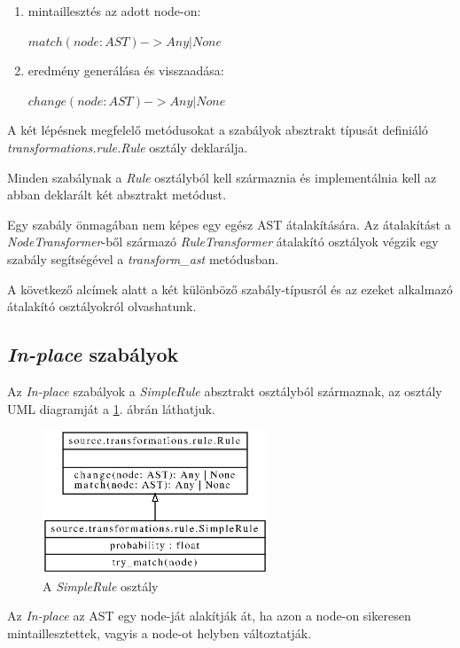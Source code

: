 \begin{enumerate}
	\item mintaillesztés az adott node-on:
	
	\(match(node: AST) -> Any | None \)
	
	\item eredmény generálása és visszaadása:
	
	\(change(node: AST) -> Any | None \)
\end{enumerate}

A két lépésnek megfelelő metódusokat a szabályok absztrakt típusát definiáló
\emph{transformations.rule.Rule} osztály deklarálja.

Minden szabálynak a \emph{Rule} osztályból kell származnia és implementálnia kell
az abban deklarált két absztrakt metódust.

Egy szabály önmagában nem képes egy egész AST átalakítására.
Az átalakítást a \emph{NodeTransformer}-ből származó \emph{RuleTransformer}
átalakító osztályok végzik egy szabály segítségével a \emph{transform\_ast} metódusban.

A következő alcímek alatt a két különböző szabály-típusról és az ezeket alkalmazó
átalakító osztályokról olvashatunk.

\subsection{\emph{In-place} szabályok}

Az \emph{In-place} szabályok a \emph{SimpleRule} absztrakt osztályból származnak,
az osztály UML diagramját a \ref{fig:SimpleRule}. ábrán láthatjuk.

\begin{figure}[H]
	\centering
	\includegraphics[width=0.6\textwidth]{images/uml/SimpleRule.eps}
	\caption{A \emph{SimpleRule} osztály}
	\label{fig:SimpleRule}
\end{figure}

Az \emph{In-place} az AST egy node-ját alakítják át,
ha azon a node-on sikeresen mintaillesztettek, vagyis a node-ot helyben változtatják.

